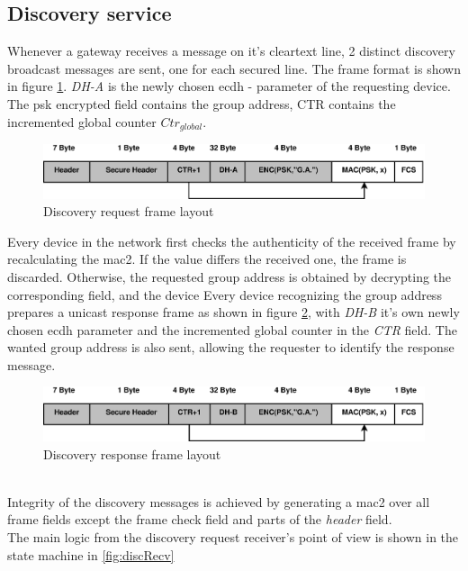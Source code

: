 \subsection{Discovery service}
Whenever a gateway receives a message on it's cleartext line, 2 distinct discovery broadcast messages are sent, one for each secured line. 
The frame format is shown in 
figure \ref{fig:discReqFormat}. \textit{DH-A} is the newly chosen \gls{ecdh} - parameter of the requesting device.
The \gls{psk} encrypted field contains the group address, CTR contains the incremented global counter $Ctr_{global}$.
\begin{figure}
  \centering
    \includegraphics[width=1\textwidth]{figures/formatDiscReq.eps}
 \caption{Discovery request frame layout}
 \label{fig:discReqFormat}
\end{figure}
Every device in the network first checks the authenticity of the received frame by recalculating the \gls{mac2}. If the value differs the received one, the frame
is discarded. Otherwise, the requested group address is obtained by decrypting the corresponding field, and the device 
Every device recognizing the group address prepares a unicast response frame as shown in figure \ref{fig:discResFormat}, 
with \textit{DH-B} it's own newly chosen \gls{ecdh} parameter and the incremented global counter in the \textit{CTR} field. The wanted group address is also
sent, allowing the requester to identify the response message.
\begin{figure}
  \centering
    \includegraphics[width=1\textwidth]{figures/formatDiscResp.eps}
 \caption{Discovery response frame layout}
 \label{fig:discResFormat}
\end{figure}
\\
Integrity of the discovery messages is achieved by generating a \gls{mac2} over all frame fields except the frame check field and parts of the \textit{header}
field.
\\
The main logic from the discovery request receiver's point of view is shown in the state machine in \ref{fig:discRecv}

